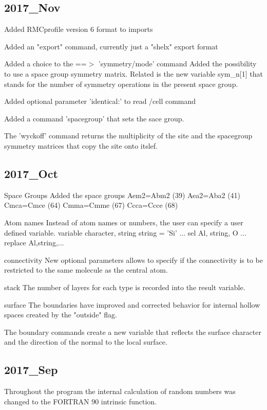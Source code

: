 \subsection*{2017\_Nov}
\par
Added RMCprofile version 6 format to imports 
\par
Added an "export" command, currently just a "shelx" export format 
\par
Added a choice to the ==$> $ 'symmetry/mode' command 
Added the possibility to use a space group symmetry matrix. 
Related is the new variable sym\_n[1] that stands for the 
number of symmetry operations in the present space group. 
\par
Added optional parameter 'identical:' to read /cell command 
\par
Added a command 'spacegroup' that sets the sace group. 
\par
The 'wyckoff' command returns the multiplicity of the site and 
the spacegroup symmetry matrices that copy the site onto itslef. 
\subsection*{2017\_Oct}
\par
Space Groups 
  Added the space groups 
  Aem2=Abm2 (39) 
  Aea2=Aba2 (41) 
  Cmca=Cmce (64) 
  Cmma=Cmme (67) 
  Ccca=Ccce (68) 
\par
Atom names 
  Instead of atom names or numbers, the user can specify a 
  user defined variable. 
  variable character, string 
  string = 'Si' 
  ... 
  sel  Al, string, O 
  ... 
  replace Al,string,... 
\par
connectivity 
  New optional parameters allows to specify if the connectivity is to 
  be restricted to the same molecule as the central atom. 
\par
stack 
  The number of layers for each type is recorded into 
  the result variable. 
\par
surface 
  The boundaries have improved and corrected behavior for internal 
  hollow spaces created by the "outside" flag. 
\par
  The boundary commands create a new variable that reflects the 
  surface character and the direction of the normal to the local 
  surface. 
\subsection*{2017\_Sep}
\par
Throughout the program the internal calculation of random numbers 
was changed to the FORTRAN 90 intrinsic function. 
